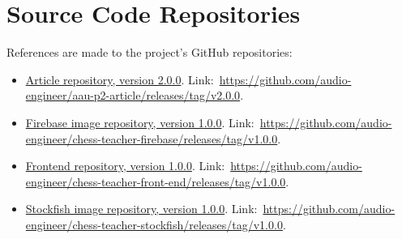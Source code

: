\chapter{Source Code Repositories}\label{ch:source-code-repositories}

References are made to the project's GitHub repositories:

\begin{itemize}
    \item \href{https://github.com/audio-engineer/aau-p2-article/releases/tag/v2.0.0}
    {Article repository, version 2.0.0}.
    Link:~\url{https://github.com/audio-engineer/aau-p2-article/releases/tag/v2.0.0}.
    \item \href{https://github.com/audio-engineer/chess-teacher-firebase/releases/tag/v1.0.0}
    {Firebase image repository, version 1.0.0}.
    Link:~\url{https://github.com/audio-engineer/chess-teacher-firebase/releases/tag/v1.0.0}.
    \item \href{https://github.com/audio-engineer/chess-teacher-front-end/releases/tag/v1.0.0}
    {Frontend repository, version 1.0.0}.
    Link:~\url{https://github.com/audio-engineer/chess-teacher-front-end/releases/tag/v1.0.0}.
    \item \href{https://github.com/audio-engineer/chess-teacher-stockfish/releases/tag/v1.0.0}
    {Stockfish image repository, version 1.0.0}.
    Link:~\url{https://github.com/audio-engineer/chess-teacher-stockfish/releases/tag/v1.0.0}.
\end{itemize}
